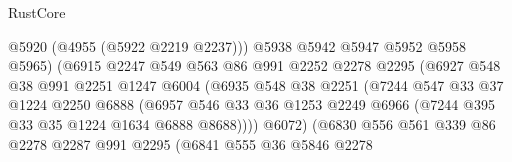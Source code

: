 \begin{lexlean}{RustCore}
\begin{coremodule}
                                      @5920
                                      (@4955 (@5922 @2219 @2237)))
                                    @5938
                                    @5942
                                    @5947
                                    @5952
                                    @5958
                                    @5965)
                                  (@6915
                                    @2247
                                    @549
                                    @563
                                    @86
                                    @991
                                    @2252
                                    @2278
                                    @2295
                                    (@6927
                                      @548
                                      @38
                                      @991
                                      @2251
                                      @1247
                                      @6004
                                      (@6935
                                        @548
                                        @38
                                        @2251
                                        (@7244
                                          @547
                                          @33
                                          @37
                                          @1224
                                          @2250
                                          @6888
                                          (@6957
                                            @546
                                            @33
                                            @36
                                            @1253
                                            @2249
                                            @6966
                                            (@7244 @395 @33 @35 @1224 @1634 @6888 @8688))))
                                      @6072)
                                    (@6830
                                      @556
                                      @561
                                      @339
                                      @86
                                      @2278
                                      @2287
                                      @991
                                      @2295
                                      (@6841
                                        @555
                                        @36
                                        @5846
                                        @2278

\end{coremodule}
\end{lexlean}
